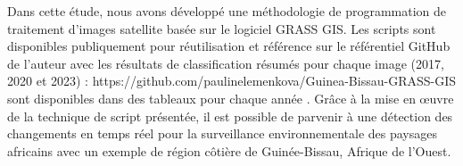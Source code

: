 \documentclass{rfpt}
\begin{document}
Dans cette étude, nous avons développé une méthodologie de programmation de traitement d'images satellite basée sur le logiciel GRASS GIS. Les scripts sont disponibles publiquement pour réutilisation et référence sur le référentiel GitHub de l'auteur avec les résultats de classification résumés pour chaque image (2017, 2020 et 2023) : https://github.com/paulinelemenkova/Guinea-Bissau-GRASS-GIS  sont disponibles dans des tableaux pour chaque année  . Grâce à la mise en œuvre de la technique de script présentée, il est possible de parvenir à une détection des changements en temps réel pour la surveillance environnementale des paysages africains avec un exemple de région côtière de Guinée-Bissau, Afrique de l'Ouest.



\end{document}
